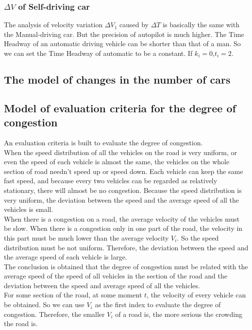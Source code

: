 \documentclass{mcmthesis}
\begin{document}
\subsubsection{$\Delta V$ of Self-driving car}
The analysis of velocity variation $\Delta V_{1}$ caused by $\Delta T$ is basically the same with the Manual-driving car. But the precision of autopilot is much higher. The Time Headway of an automatic driving vehicle can be shorter than that of a man. So we can set the Time Headway of automatic to be a constant. If $k_i=0$,$t_i=2$.

\subsection{The model of changes in the number of cars}
\label{changes of cars}
 
\subsection{Model of evaluation criteria for the degree of congestion}
An evaluation criteria is built to evaluate the degree of congestion.\\ 
\indent When the speed distribution of all the vehicles on the road is very uniform, or even the speed of each vehicle is almost the same, the vehicles on the whole section of road needn't speed up or speed down. Each vehicle can keep the same fast speed, and because every two vehicles can be regarded as relatively stationary, there will almost be no congestion. Because the speed distribution is very uniform, the deviation between the speed and the average speed of all the vehicles is small.\\
\indent When there is a congestion on a road, the average velocity of the vehicles must be slow. When there is a congestion only in one part of the road, the velocity in this part must be much lower than the average velocity $ V_{i} $. So the speed distribution must be not uniform. Therefore, the deviation between the speed and the average speed of each vehicle is large.\\  
\indent The conclusion is obtained that the degree of congestion must be related with the average speed of the speed of all vehicles in the section of the road and the deviation between the speed and average speed of all the vehicles.\\
\indent For some section of the road, at some moment $t$, the velocity of every vehicle can be obtained. So we can use $ V_{i} $ as the first index to evaluate the degree of congestion. Therefore, the smaller $V_{i}$ of a road is, the more serious the crowding the road is.\\
\end{document}
